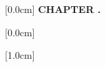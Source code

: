 \theoremstyle{definition}
\newtheorem{example}{Example}[chapter]

\onehalfspacing
\setlength{\parskip}{6pt}
\setlength{\parindent}{15pt}

\renewcommand*\contentsname{TABLE OF CONTENTS}
    [0.0cm]
    {\bfseries\vspace{0.3cm}}
    {{\bfseries{\scshape} CHAPTER \thecontentslabel.\ }}
    {}
    {\contentspage}
    
    [0.0cm]
    {\vspace{0.3cm}}
    {\thecontentslabel \ }
    {}
    {\contentspage}
    
    [1.0cm]
    {\vspace{0.3cm}}
    {\thecontentslabel \ }
    {}
    {\contentspage}


\renewcommand{\figurename}{Figure}
\renewcommand{\tablename}{Table}
\renewcommand{\chaptername}{CHAPTER}
